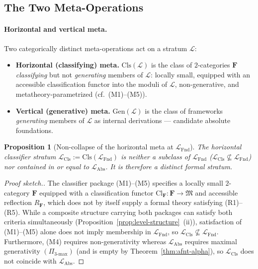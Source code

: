 \documentclass[11pt]{article}
\theoremstyle{plain}
\newtheorem{proposition}[theorem]{Proposition}
\theoremstyle{definition}
\newcommand{\fM}{\mathfrak{M}}
\newcommand{\LFnd}{\mathcal{L}_{\mathrm{Fnd}}}
\newcommand{\LCls}{\mathcal{L}_{\mathrm{Cls}}}
\newcommand{\LAbs}{\mathcal{L}_{\mathrm{Abs}}}
\newcommand{\Cl}{\mathrm{Cl}}
\begin{document}
\subsection{The Two Meta-Operations}\label{sec:indexing-scheme}

\paragraph{Horizontal and vertical meta.} Two categorically distinct meta-operations act on a stratum $\mathcal{L}$:
\begin{itemize}
\item \textbf{Horizontal (classifying) meta.} $\mathrm{Cls}(\mathcal{L})$ is the class of $2$-categories $\mathbf{F}$ \emph{classifying} but not \emph{generating} members of $\mathcal{L}$: locally small, equipped with an accessible classification functor into the moduli of $\mathcal{L}$, non-generative, and metatheory-parametrized (cf.\ (M1)--(M5)).
\item \textbf{Vertical (generative) meta.} $\mathrm{Gen}(\mathcal{L})$ is the class of frameworks \emph{generating} members of $\mathcal{L}$ as internal derivations --- candidate absolute foundations.
\end{itemize}

\begin{proposition}[Non-collapse of the horizontal meta at $\LFnd$]\label{prop:no-collapse}
The horizontal classifier stratum $\LCls := \mathrm{Cls}(\LFnd)$ is neither a subclass of $\LFnd$ ($\LCls \not\subseteq \LFnd$) nor contained in or equal to $\LAbs$. It is therefore a distinct formal stratum.
\end{proposition}

\begin{proof}[Proof sketch.]
The classifier package (M1)--(M5) specifies a locally small $2$-category $\mathbf{F}$ equipped with a classification functor $\Cl_{\mathbf{F}} : \mathbf{F} \to \fM$ and accessible reflection $R_{\mathbf{F}}$, which does not by itself supply a formal theory satisfying (R1)--(R5). While a composite structure carrying both packages can satisfy both criteria simultaneously (Proposition~\ref{prop:level-structure}~(ii)), satisfaction of (M1)--(M5) alone does not imply membership in $\LFnd$, so $\LCls \not\subseteq \LFnd$. Furthermore, (M4) requires non-generativity whereas $\LAbs$ requires maximal generativity $(\Pi_{3\text{-max}})$ (and is empty by Theorem~\ref{thm:afnt-alpha}), so $\LCls$ does not coincide with $\LAbs$.
\end{proof}
\end{document}
